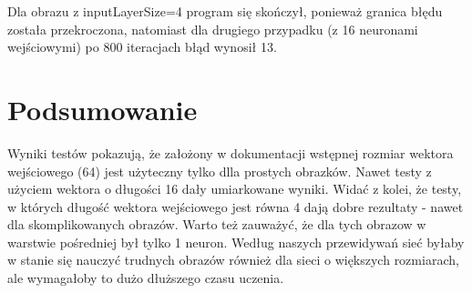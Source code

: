 \documentclass[12pt,a4paper,oneside]{article}
\begin{document}
Dla obrazu z inputLayerSize=4 program się skończył, ponieważ granica błędu została przekroczona, natomiast dla drugiego przypadku (z 16 neuronami wejściowymi) po 800 iteracjach błąd wynosił 13.


\section{Podsumowanie}
Wyniki testów pokazują, że założony w dokumentacji wstępnej rozmiar wektora wejściowego (64) jest użyteczny tylko dlla prostych obrazków. Nawet testy z użyciem wektora o długości 16 dały umiarkowane wyniki. Widać z kolei, że testy, w których długość wektora wejściowego jest równa 4 dają dobre rezultaty - nawet dla skomplikowanych obrazów. Warto też zauważyć, że dla tych obrazow w warstwie pośredniej był tylko 1 neuron. Według naszych przewidywań sieć byłaby w stanie się nauczyć trudnych obrazów również dla sieci o większych rozmiarach, ale wymagałoby to dużo dłuższego czasu uczenia.
\end{document}
